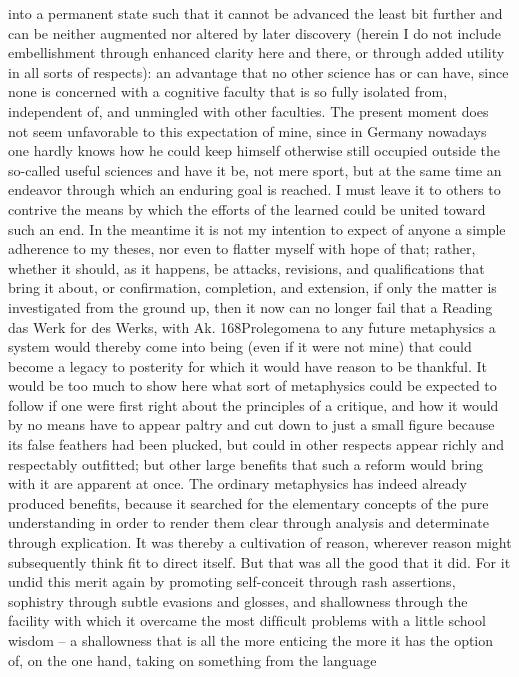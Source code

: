 into a permanent state such that it cannot be advanced the least bit further
and can be neither augmented nor altered by later discovery (herein I
do not include embellishment through enhanced clarity here and there,
or through added utility in all sorts of respects): an advantage that no
other science has or can have, since none is concerned with a cognitive
faculty that is so fully isolated from, independent of, and unmingled
with other faculties. The present moment does not seem unfavorable to
this expectation of mine, since in Germany nowadays one hardly knows
how he could keep himself otherwise still occupied outside the so-called
useful sciences and have it be, not mere sport, but at the same time an
endeavor through which an enduring goal is reached.
I must leave it to others to contrive the means by which the efforts
of the learned could be united toward such an end. In the meantime
it is not my intention to expect of anyone a simple adherence to my
theses, nor even to ﬂatter myself with hope of that; rather, whether it
should, as it happens, be attacks, revisions, and qualiﬁcations that bring
it about, or conﬁrmation, completion, and extension, if only the matter
is investigated from the ground up, then it now can no longer fail that
a
Reading das Werk for des Werks, with Ak.
168Prolegomena to any future metaphysics
a system would thereby come into being (even if it were not mine) that
could become a legacy to posterity for which it would have reason to be
thankful.
It would be too much to show here what sort of metaphysics could be
expected to follow if one were ﬁrst right about the principles of a critique,
and how it would by no means have to appear paltry and cut down to just a
small ﬁgure because its false feathers had been plucked, but could in other
respects appear richly and respectably outﬁtted; but other large beneﬁts
that such a reform would bring with it are apparent at once. The ordinary
metaphysics has indeed already produced beneﬁts, because it searched
for the elementary concepts of the pure understanding in order to render
them clear through analysis and determinate through explication. It was
thereby a cultivation of reason, wherever reason might subsequently
think ﬁt to direct itself. But that was all the good that it did. For it
undid this merit again by promoting self-conceit through rash assertions,
sophistry through subtle evasions and glosses, and shallowness through
the facility with which it overcame the most difﬁcult problems with a little
school wisdom – a shallowness that is all the more enticing the more it has
the option of, on the one hand, taking on something from the language
